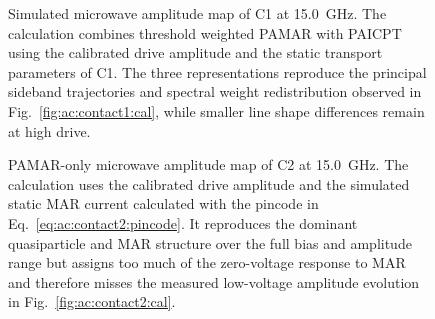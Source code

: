        \begin{figure}[p]
            \centering
            \caption{
                Calibrated microwave amplitude map of C1 under stripline irradiation at \qty{15.0}{\giga\hertz}. The \textit{I--V}, \textit{dI--dV}, and \textit{dV--dI} columns display the same measurement as heat maps, surfaces, and representative waterfall cuts. Photon assisted replicas emerge from the quasiparticle and MAR thresholds, while narrow features originating from the zero-bias peak disperse across the reduced amplitude axis $eA/h\nu$.
                }
            \label{fig:ac:contact1:cal}


            \caption{
                Simulated microwave amplitude map of C1 at \qty{15.0}{\giga\hertz}. The calculation combines threshold weighted PAMAR with PAICPT using the calibrated drive amplitude and the static transport parameters of C1. The three representations reproduce the principal sideband trajectories and spectral weight redistribution observed in Fig.~\ref{fig:ac:contact1:cal}, while smaller line shape differences remain at high drive.
                }
            \label{fig:ac:contact1:sim}
        \end{figure}

        \begin{figure}[p]
            \centering
            \caption{
                Calibrated microwave amplitude map of C2 under stripline irradiation at \qty{15.0}{\giga\hertz}. The \textit{I--V}, \textit{dI--dV}, and \textit{dV--dI} representations show the strong subgap response of the nearly ballistic leading channel. The measured low-voltage features exhibit an amplitude dependence that is not fully captured by the PAMAR-only simulation in Fig.~\ref{fig:ac:contact2:sim}.
                }
            \label{fig:ac:contact2:cal}


            \caption{
                PAMAR-only microwave amplitude map of C2 at \qty{15.0}{\giga\hertz}. The calculation uses the calibrated drive amplitude and the simulated static MAR current calculated with the pincode in Eq.~\eqref{eq:ac:contact2:pincode}. It reproduces the dominant quasiparticle and MAR structure over the full bias and amplitude range but assigns too much of the zero-voltage response to MAR and therefore misses the measured low-voltage amplitude evolution in Fig.~\ref{fig:ac:contact2:cal}.
                }
            \label{fig:ac:contact2:sim}
        \end{figure}

